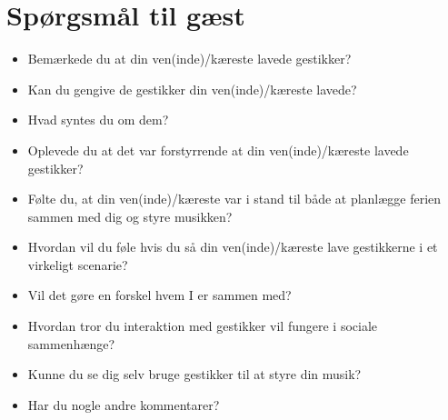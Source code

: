 \section{Spørgsmål til gæst}
\label{app:ExitInterviewGaest}
%
\begin{itemize}
  \item Bemærkede du at din ven(inde)/kæreste lavede gestikker? 
  \item Kan du gengive de gestikker din ven(inde)/kæreste lavede?
  \item Hvad syntes du om dem? 
  \item Oplevede du at det var forstyrrende at din ven(inde)/kæreste lavede gestikker? 
  \item Følte du, at din ven(inde)/kæreste var i stand til både at planlægge ferien sammen med dig og styre musikken?
  \item Hvordan vil du føle hvis du så din ven(inde)/kæreste lave gestikkerne i et virkeligt scenarie?
  \item Vil det gøre en forskel hvem I er sammen med?
  \item Hvordan tror du interaktion med gestikker vil fungere i sociale sammenhænge? 
  \item Kunne du se dig selv bruge gestikker til at styre din musik?
  \item Har du nogle andre kommentarer?
\end{itemize}



 